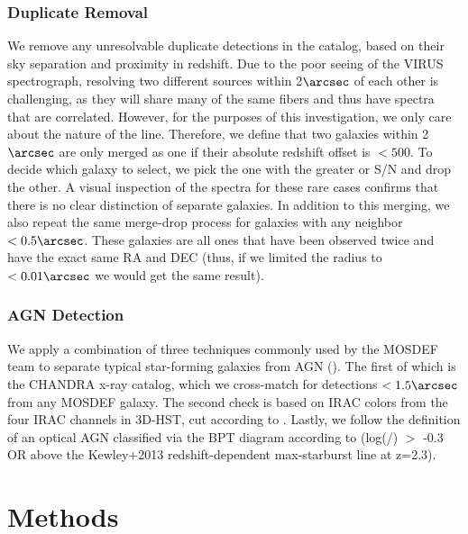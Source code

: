 \documentclass[linenumbers,amsmath,trackchanges,preprint2]{aastex702}
\begin{document}

\subsubsection{Duplicate Removal}
\par We remove any unresolvable duplicate detections in the catalog, based on their sky separation and proximity in redshift. Due to the poor seeing of the VIRUS spectrograph, resolving two different sources within 2$\arcsec$ of each other is challenging, as they will share many of the same fibers and thus have spectra that are correlated. However, for the purposes of this investigation, we only care about the nature of the \lya line. Therefore, we define that two galaxies within 2$\arcsec$ are only merged as one if their absolute redshift offset is $<500$\kms. To decide which galaxy to select, we pick the one with the greater \Ha or \OIII S/N and drop the other. A visual inspection of the spectra for these rare cases confirms that there is no clear distinction of separate galaxies. In addition to this merging, we also repeat the same merge-drop process for galaxies with any neighbor $<0.5\arcsec$. These galaxies are all ones that have been observed twice and have the exact same RA and DEC (thus, if we limited the radius to $<0.01\arcsec$ we would get the same result).
\subsubsection{AGN Detection}
\par We apply a combination of three techniques commonly used by the MOSDEF team to separate typical star-forming galaxies from AGN (\cite{azadi2017}). The first of which is the CHANDRA x-ray catalog, which we cross-match for detections $<1.5\arcsec$ from any MOSDEF galaxy. The second check is based on IRAC colors from the four IRAC channels in 3D-HST, cut according to \cite{donley2012}. Lastly, we follow the definition of an optical AGN classified via the BPT diagram according to \cite{melendez2014} (log(\NII/\Ha) $>$ -0.3 OR above the Kewley+2013 redshift-dependent max-starburst line at z=2.3).


\section{Methods}
\end{document}
